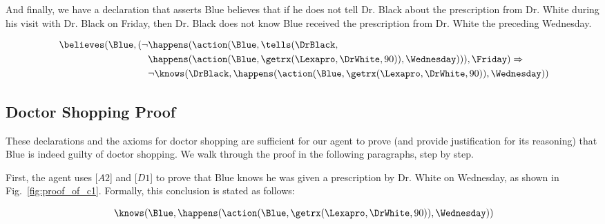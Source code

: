 \noindent And finally, we have a declaration that asserts Blue believes that if he does not tell Dr. Black about the prescription from Dr. White during his visit with Dr. Black on Friday, then Dr. Black does not know Blue received the prescription from Dr. White the preceding Wednesday.
\begin{footnotesize}
\begin{align*}
[D4] \ \believes(\Blue,(\neg&\happens(\action(\Blue,\tells(\DrBlack,\\
	& \happens(\action(\Blue,\getrx(\Lexapro,\DrWhite,90)),\Wednesday))),\Friday) \Rightarrow \\
	& \neg\knows(\DrBlack,\happens(\action(\Blue,\getrx(\Lexapro,\DrWhite,90)),\Wednesday))
\end{align*}
\end{footnotesize}

\subsection{Doctor Shopping Proof}

These declarations and the axioms for doctor shopping are sufficient for our agent to prove (and provide justification for its reasoning) that Blue is indeed guilty of doctor shopping.  We walk through the proof in the following paragraphs, step by step.



First, the agent uses [$A2$] and [$D1$] to prove that Blue knows he was given a prescription by Dr. White on Wednesday, as shown in Fig.~\ref{fig:proof_of_c1}.  Formally, this conclusion is stated as follows:
\begin{footnotesize}
\begin{align*}
[C1] \ \knows(\Blue,\happens(\action(\Blue,\getrx(\Lexapro,\DrWhite,90)),\Wednesday))
\end{align*}
\end{footnotesize}

